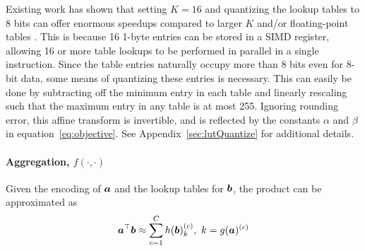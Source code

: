 Existing work has shown that setting $K = 16$ and quantizing the lookup tables to 8 bits can offer enormous speedups compared to larger $K$ and/or floating-point tables \cite{bolt, quickAdc, quickerAdc}. This is because 16 1-byte entries can be stored in a SIMD register, allowing 16 or more table lookups to be performed in parallel in a single instruction. Since the table entries naturally occupy more than 8 bits even for 8-bit data, some means of quantizing these entries is necessary. This can easily be done by subtracting off the minimum entry in each table and linearly rescaling such that the maximum entry in any table is at most 255. Ignoring rounding error, this affine transform is invertible, and is reflected by the constants $\alpha$ and $\beta$ in equation~\ref{eq:objective}. See Appendix~\ref{sec:lutQuantize} for additional details.


\vspace{-2mm}
\paragraph{Aggregation, $f(\cdot,\cdot)$}

Given the encoding of $\bm{a}$ and the lookup tables for $\bm{b}$, the product can be approximated as
\vspace{-3mm}
\begin{align}
    \bm{a}^\top \bm{b} \approx \sum_{c=1}^C h(\bm{b})^{(c)}_k, \text{ }k = g(\bm{a})^{(c)}
\end{align}



